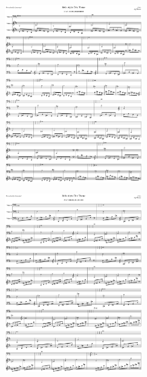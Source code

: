 \begin{figure}[H]                                             
{                                                             
  \setlength{\tabcolsep}{3.0pt}                               
  \setlength\cmidrulewidth{\heavyrulewidth} %
    \begin{subfigure}{0.5\textwidth}                            
  \includegraphics[width=6cm]{music/title_no_37_page_1001.png}%
    \end{subfigure}                                             
  \begin{subfigure}{0.5\textwidth}                            
  \includegraphics[width=6cm]{music/title_no_38_page_1001.png}%
    \end{subfigure}                                             
}                                                             
\end{figure}                                                  


